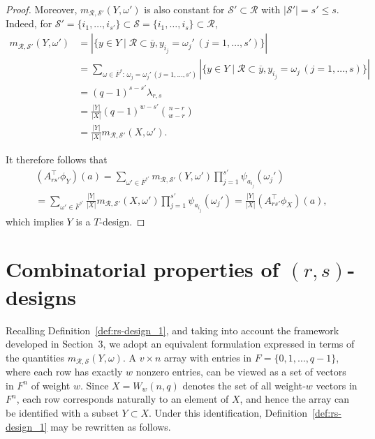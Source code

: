 \documentclass[a4paper, 11pt]{article}
\theoremstyle{definition}
\begin{document}
\begin{proof}
Moreover, $m_{\mathcal{R},\mathcal{S}'}(Y,\omega')$ is also constant for $\mathcal{S}'\subset \mathcal{R}$ with $|\mathcal{S}'|=s'\leq s$. 
Indeed, for $\mathcal{S}'=\{i_1,\ldots,i_{s'}\} \subset \mathcal{S}=\{i_1,\ldots, i_s\} \subset \mathcal{R}$, 
\begin{align}
m_{\mathcal{R},\mathcal{S'}}(Y,\omega')&=|\{y \in Y \mid \mathcal{R} \subset \overline{y},y_{i_j}=\omega_{j}'\, (j=1,\ldots,s')\}|\nonumber\\
&=\sum_{\omega \in \overline{F}^s\colon\,  \omega_{j}=\omega_{j}'\, (j=1,\ldots,s')} 
|\{y \in Y \mid \mathcal{R} \subset \overline{y},y_{i_j}=\omega_{j}\, (j=1,\ldots,s)\}|\nonumber\\
&=(q-1)^{s-s'} \lambda_{r,s} \label{eq:(q-1)ss'lambda}\\
&=\frac{|Y|}{|X|} (q-1)^{w-s'}\binom{n-r}{w-r}\nonumber\\
&=\frac{|Y|}{|X|} m_{\mathcal{R},\mathcal{S'}}(X,\omega').\nonumber 
\end{align}

It therefore follows that 
\begin{multline*}
(A_{rs'}^\top \phi_Y)(a)=\sum_{\omega' \in \overline{F}^{s'}} 
   m_{\mathcal{R},\mathcal{S'}}(Y,\omega') 
   \prod_{j=1}^{s'} \psi_{a_{i_j}}(\omega_j')\\
   =\sum_{\omega' \in \overline{F}^{s'}} 
   \frac{|Y|}{|X|}m_{\mathcal{R},\mathcal{S}'}(X,\omega') 
   \prod_{j=1}^{s'} \psi_{a_{i_j}}(\omega_j')=\frac{|Y|}{|X|}(A_{rs'}^\top \phi_X)(a),
    \end{multline*}
    which implies $Y$ is a $T$-design. 
\end{proof}
\section{Combinatorial properties of $(r,s)$-designs} \label{sec:4}

Recalling Definition~\ref{def:rs-design_1}, and taking into account the framework developed in Section~3, we adopt an equivalent formulation expressed in terms of the quantities $m_{\mathcal{R},\mathcal{S}}(Y,\omega)$.
A $v \times n$ array with entries in $F=\{0,1,\ldots,q-1\}$, where each row has exactly $w$ nonzero entries, can be viewed as a set of vectors in $F^{n}$ of weight $w$.
Since $X = W_w(n,q)$ denotes the set of all weight‑$w$ vectors in $F^{n}$, each row corresponds naturally to an element of $X$, and hence the array can be identified with a subset $Y \subset X$.
Under this identification, Definition~\ref{def:rs-design_1} may be rewritten as follows.
\end{document}
